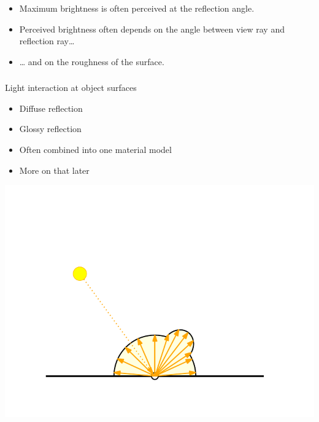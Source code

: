 \documentclass[utf8,stillsansserifmath,fleqn,t]{beamer}
\begin{document}
\begin{frame}[label=intro-glossy]
\vspace*{-1ex}
\begin{itemize}
\item<2-> Maximum brightness is often perceived at the reflection angle.
\item<3-> Perceived brightness often depends on the angle between view ray and
reflection ray\ldots{}
\item<4-> \ldots{} and on the roughness of the surface.
\end{itemize}
\end{frame}

\begin{frame}
\frametitle{\insertsection}
Light interaction at object surfaces
\begin{itemize}
\item Diffuse reflection
\item Glossy reflection
\item Often combined into one material model
\item More on that later
\end{itemize}
\centerline{\includegraphics[width=.7\textwidth]{./fig/reflection-diffuse-and-glossy.pdf}}
\end{frame}
\end{document}
